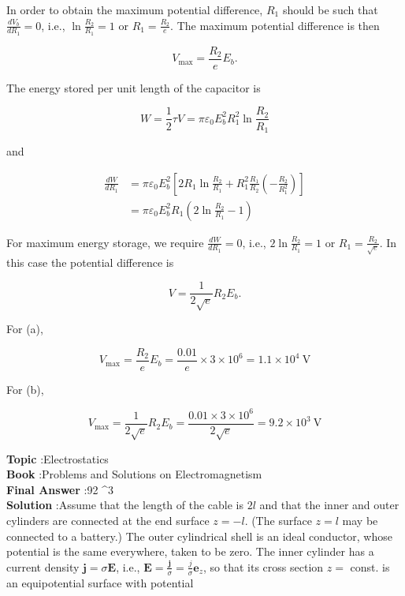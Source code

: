 \documentclass[10pt]{article}
\begin{document}
In order to obtain the maximum potential difference, $R_{1}$ should be such that $\frac{d V_{b}}{d R_{1}}=0$, i.e., $\ln \frac{R_{2}}{R_{1}}=1$ or $R_{1}=\frac{R_{2}}{e}$. The maximum potential difference is then

$$
V_{\max }=\frac{R_{2}}{e} E_{b} .
$$

 The energy stored per unit length of the capacitor is

$$
W=\frac{1}{2} \tau V=\pi \varepsilon_{0} E_{b}^{2} R_{1}^{2} \ln \frac{R_{2}}{R_{1}}
$$

and

$$
\begin{aligned}
\frac{d W}{d R_{1}} &=\pi \varepsilon_{0} E_{b}^{2}\left[2 R_{1} \ln \frac{R_{2}}{R_{1}}+R_{1}^{2} \frac{R_{1}}{R_{2}}\left(-\frac{R_{2}}{R_{1}^{2}}\right)\right] \\
&=\pi \varepsilon_{0} E_{b}^{2} R_{1}\left(2 \ln \frac{R_{2}}{R_{1}}-1\right)
\end{aligned}
$$

For maximum energy storage, we require $\frac{d W}{d R_{1}}=0$, i.e., $2 \ln \frac{R_{2}}{R_{1}}=1$ or $R_{1}=\frac{R_{2}}{\sqrt{e}}$. In this case the potential difference is

$$
V=\frac{1}{2 \sqrt{e}} R_{2} E_{b} .
$$

 For (a),

$$
V_{\max }=\frac{R_{2}}{e} E_{b}=\frac{0.01}{e} \times 3 \times 10^{6}=1.1 \times 10^{4} \mathrm{~V}
$$

For (b),

$$
V_{\max }=\frac{1}{2 \sqrt{e}} R_{2} E_{b}=\frac{0.01 \times 3 \times 10^{6}}{2 \sqrt{e}}=9.2 \times 10^{3} \mathrm{~V}
$$


\textbf{Topic} :Electrostatics\\
\textbf{Book} :Problems and Solutions on Electromagnetism\\
\textbf{Final Answer} :92 ^{3} \\


\textbf{Solution} :Assume that the length of the cable is $2 l$ and that the inner and outer cylinders are connected at the end surface $z=-l$.
(The surface $z=l$ may be connected to a battery.) The outer cylindrical shell is an ideal conductor, whose potential is the same everywhere, taken to be zero. The inner cylinder has a current density $\mathbf{j}=\sigma \mathbf{E}$, i.e., $\mathbf{E}=\frac{\mathbf{j}}{\sigma}=\frac{j}{\sigma} \mathbf{e}_{z}$, so that its cross section $z=$ const. is an equipotential surface with potential
\end{document}
